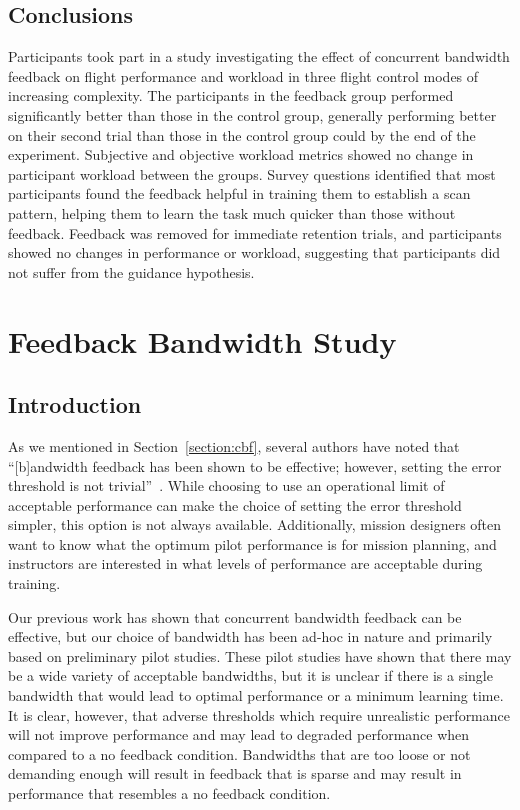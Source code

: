 \section{Conclusions}
Participants took part in a study investigating the effect of concurrent bandwidth feedback on flight performance and workload in three flight control modes of increasing complexity.
The participants in the feedback group performed significantly better than those in the control group, generally performing better on their second trial than those in the control group could by the end of the experiment.
Subjective and objective workload metrics showed no change in participant workload between the groups.
Survey questions identified that most participants found the feedback helpful in training them to establish a scan pattern, helping them to learn the task much quicker than those without feedback.
Feedback was removed for immediate retention trials, and participants showed no changes in performance or workload, suggesting that participants did not suffer from the guidance hypothesis.

\chapter{Feedback Bandwidth Study}
\label{chapter:bandwidthstudy}

\section{Introduction}

As we mentioned in Section~\ref{section:cbf}, several authors have noted that ``[b]andwidth feedback has been shown to be effective; however, setting the error threshold is not trivial''~\citep{timmermans_technology-assisted_2009, RIBEIRO2011231, sigrist_augmented_2013}.
While choosing to use an operational limit of acceptable performance can make the choice of setting the error threshold simpler, this option is not always available.
Additionally, mission designers often want to know what the optimum pilot performance is for mission planning, and instructors are interested in what levels of performance are acceptable during training.

Our previous work has shown that concurrent bandwidth feedback can be effective, but our choice of bandwidth has been ad-hoc in nature and primarily based on preliminary pilot studies.
These pilot studies have shown that there may be a wide variety of acceptable bandwidths, but it is unclear if there is a single bandwidth that would lead to optimal performance or a minimum learning time.
It is clear, however, that adverse thresholds which require unrealistic performance will not improve performance and may lead to degraded performance when compared to a no feedback condition.
Bandwidths that are too loose or not demanding enough will result in feedback that is sparse and may result in performance that resembles a no feedback condition.

